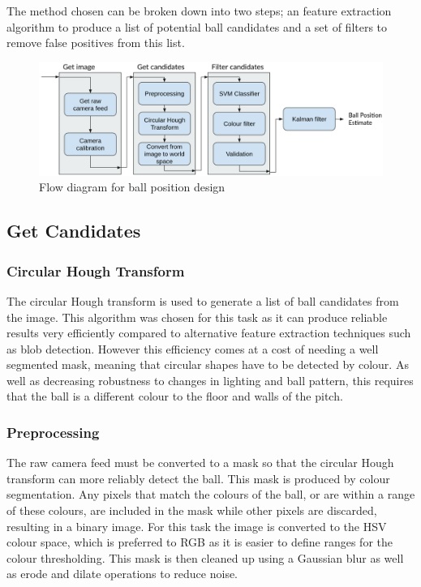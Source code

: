 The method chosen can be broken down into two steps; an feature extraction algorithm to produce a list of potential ball candidates and a set of filters to remove false positives from this list.

\begin{figure}[H]
    \centering
    \includegraphics[width=16cm]{images/position-design.png}
    \caption{Flow diagram for ball position design}
    \label{fig:position design}
\end{figure}

\subsection{Get Candidates}

\subsubsection{Circular Hough Transform}
\label{section: Hough design}

The circular Hough transform is used to generate a list of ball candidates from the image. This algorithm was chosen for this task as it can produce reliable results very efficiently compared to alternative feature extraction techniques such as blob detection. However this efficiency comes at a cost of needing a well segmented mask, meaning that circular shapes have to be detected by colour. As well as decreasing robustness to changes in lighting and ball pattern, this requires that the ball is a different colour to the floor and walls of the pitch. 

\subsubsection{Preprocessing}

The raw camera feed must be converted to a mask so that the circular Hough transform can more reliably detect the ball. This mask is produced by colour segmentation. Any pixels that match the colours of the ball, or are within a range of these colours, are included in the mask while other pixels are discarded, resulting in a binary image. For this task the image is converted to the HSV colour space, which is preferred to RGB as it is easier to define ranges for the colour thresholding. This mask is then cleaned up using a Gaussian blur as well as erode and dilate operations to reduce noise.

